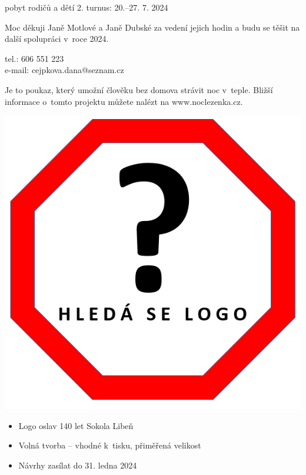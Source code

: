 \documentclass[11pt]{article}
\begin{document}
pobyt rodičů a dětí 2. turnus: 20.–27. 7. 2024
\vspace*{6pt}

\noindent
Moc děkuji Janě Motlové a Janě Dubské za vedení jejich hodin a budu se těšit na další spolupráci v~roce 2024.

\signature{Dana Cejpková}{tel.: 606 551 223\\e-mail: cejpkova.dana@seznam.cz}


\vspace*{24pt}

Je to poukaz, který umožní člověku bez domova strávit noc v~teple. Bližší informace o~tomto projektu můžete nalézt na www.noclezenka.cz.


\vspace*{24pt}
\clearpage


\noindent

\begin{minipage}{0.3\linewidth}   
  \includegraphics[width=0.98\linewidth]{soutez_logo.png} 
\end{minipage}
\begin{minipage}{0.6\linewidth}
  \begin{itemize}
    \item Logo oslav 140 let Sokola Libeň
    \item Volná tvorba – vhodné k~tisku, přiměřená velikost
    \item Návrhy zasílat do 31. ledna 2024
  \end{itemize}
\end{minipage}
\end{document}
